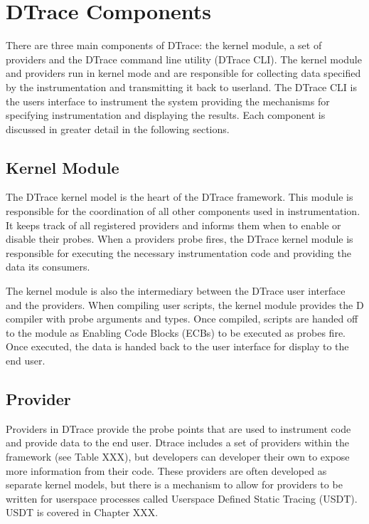 \section{DTrace Components}

There are three main components of DTrace: the kernel module, a set of providers and the DTrace command line utility (DTrace CLI). The kernel module and providers run in kernel mode and are responsible for collecting data specified by the instrumentation and transmitting it back to userland. The DTrace CLI is the users interface to instrument the system providing the mechanisms for specifying instrumentation and displaying the results. Each component is discussed in greater detail in the following sections.

\subsection{Kernel Module}

The DTrace kernel model is the heart of the DTrace framework. This module is responsible for the coordination of all other components used in instrumentation. It keeps track of all registered providers and informs them when to enable or disable their probes. When a providers probe fires, the DTrace kernel module is responsible for executing the necessary instrumentation code and providing the data its consumers.

The kernel module is also the intermediary between the DTrace user interface and the providers. When compiling user scripts, the kernel module provides the D compiler with probe arguments and types. Once compiled, scripts are handed off to the module as Enabling Code Blocks (ECBs) to be executed as probes fire. Once executed, the data is handed back to the user interface for display to the end user.

\subsection{Provider}

Providers in DTrace provide the probe points that are used to instrument code and provide data to the end user. Dtrace includes a set of providers within the framework (see Table XXX), but developers can developer their own to expose more information from their code. These providers are often developed as separate kernel models, but there is a mechanism to allow for providers to be written for userspace processes called Userspace Defined Static Tracing (USDT). USDT is covered in Chapter XXX.

